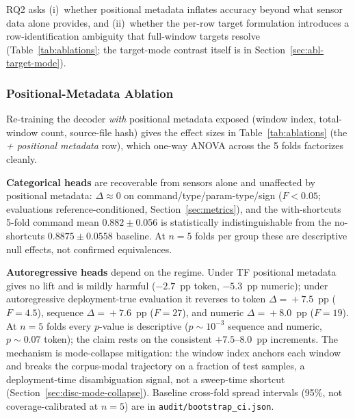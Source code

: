 \documentclass[sensors,article,submit,moreauthors,pdftex]{Definitions/mdpi}
\begin{document}
RQ2 asks (i)~whether positional metadata inflates accuracy beyond what sensor data alone provides, and (ii)~whether the per-row target formulation introduces a row-identification ambiguity that full-window targets resolve (Table~\ref{tab:ablations}; the target-mode contrast itself is in Section~\ref{sec:abl-target-mode}).



\subsubsection{Positional-Metadata Ablation}
\label{sec:abl-positional}
Re-training the decoder \emph{with} positional metadata exposed (window index, total-window count, source-file hash) gives the effect sizes in Table~\ref{tab:ablations} (the \emph{+ positional metadata} row), which one-way ANOVA across the 5 folds factorizes cleanly.

\textbf{Categorical heads} are recoverable from sensors alone and unaffected by positional metadata: $\Delta\!\approx\!0$ on command/type/param-type/sign ($F<0.05$; evaluations reference-conditioned, Section~\ref{sec:metrics}), and the with-shortcuts 5-fold command mean $0.882 \pm 0.056$ is statistically indistinguishable from the no-shortcuts $0.8875 \pm 0.0558$ baseline. At $n\!=\!5$ folds per group these are descriptive null effects, not confirmed equivalences.

\textbf{Autoregressive heads} depend on the regime. Under TF positional metadata gives no lift and is mildly harmful ($-2.7$~pp token, $-5.3$~pp numeric); under autoregressive deployment-true evaluation it reverses to token $\Delta\!=\!+7.5$~pp ($F\!=\!4.5$), sequence $\Delta\!=\!+7.6$~pp ($F\!=\!27$), and numeric $\Delta\!=\!+8.0$~pp ($F\!=\!19$). At $n\!=\!5$ folds every $p$-value is descriptive ($p\!\sim\!10^{-3}$ sequence and numeric, $p\!\sim\!0.07$ token); the claim rests on the consistent $+7.5$--$8.0$~pp increments. The mechanism is mode-collapse mitigation: the window index anchors each window and breaks the corpus-modal trajectory on a fraction of test samples, a deployment-time disambiguation signal, not a sweep-time shortcut (Section~\ref{sec:disc-mode-collapse}). Baseline cross-fold spread intervals (95\%, not coverage-calibrated at $n\!=\!5$) are in \texttt{audit/bootstrap\_ci.json}.
\end{document}
